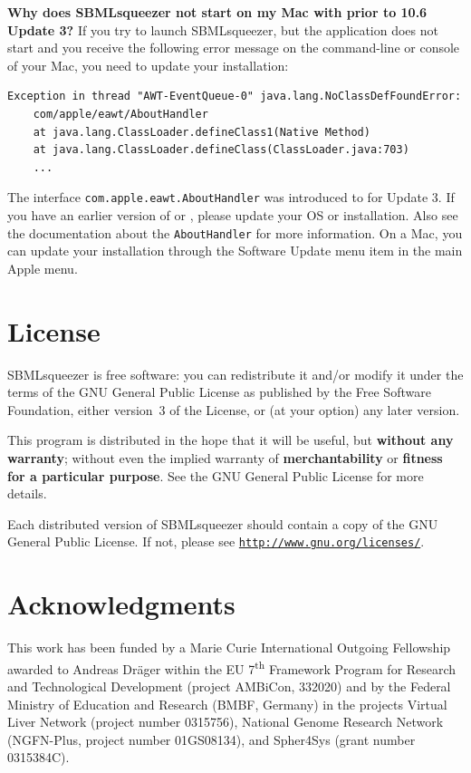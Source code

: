 \noindent 
\textbf{Why does SBMLsqueezer not start on my Mac with \MacOSX prior to 10.6 Update 3?}\newline
If you try to launch SBMLsqueezer, but the application does
not start and you receive the following error message on the command-line or
\Java console of your Mac, you need to update your \Java installation:
\begin{verbatim}
Exception in thread "AWT-EventQueue-0" java.lang.NoClassDefFoundError:
    com/apple/eawt/AboutHandler
    at java.lang.ClassLoader.defineClass1(Native Method)
    at java.lang.ClassLoader.defineClass(ClassLoader.java:703)
    ...
\end{verbatim}
The interface \texttt{com.apple.eawt.AboutHandler} was introduced to \Java for
 Update 3. If you have an earlier version of \MacOSX or \Java,
please update your OS or \Java installation. Also see the \MacOSX documentation
about the \texttt{AboutHandler} for more information. On a Mac, you can update
your \Java installation through the Software Update menu item in the main Apple
menu.

\chapter{License}

SBMLsqueezer is free software: you can redistribute it and/or modify
it under the terms of the GNU General Public License as published by
the Free Software Foundation, either version~3 of the License, or
(at your option) any later version.

This program is distributed in the hope that it will be useful,
but \textbf{without any warranty}; without even the implied warranty of
\textbf{merchantability} or \textbf{fitness for a particular purpose}. See the
GNU General Public License for more details.

Each distributed version of SBMLsqueezer should contain a copy of the 
GNU General Public License. If not, please see
\href{http://www.gnu.org/licenses/gpl-3.0-standalone.html}{\nolinkurl{http://www.gnu.org/licenses/}}.

\chapter{Acknowledgments}

This work has been funded by a Marie Curie International Outgoing Fellowship
awarded to Andreas Dr\"ager within the EU 7\textsuperscript{th} Framework
Program for Research and Technological Development (project AMBiCon, 332020) and
by the Federal Ministry of Education and Research (BMBF, Germany) in the
projects Virtual Liver Network (project number 0315756), National Genome
Research Network (NGFN-Plus, project number 01GS08134), and Spher4Sys (grant
number 0315384C).

